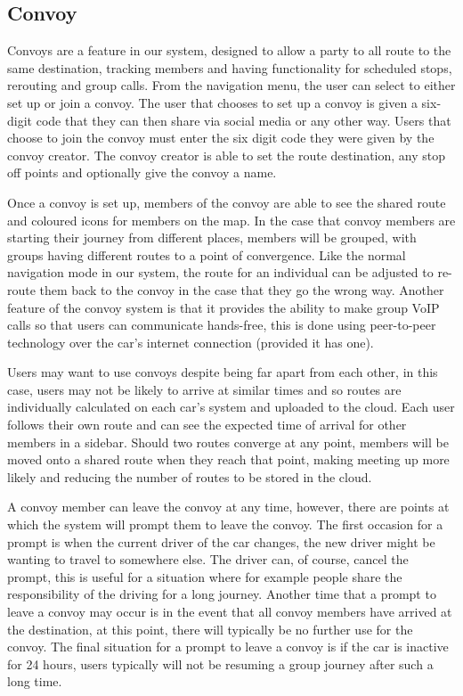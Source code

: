 \documentclass{article}
\begin{document}
\subsection{Convoy}\label{ssec:nav-convoy} %
Convoys are a feature in our system, designed to allow a party to all route to the same destination, tracking members and having functionality for scheduled stops, rerouting and group calls. From the navigation menu, the user can select to either set up or join a convoy. The user that chooses to set up a convoy is given a six-digit code that they can then share via social media or any other way. Users that choose to join the convoy must enter the six digit code they were given by the convoy creator. The convoy creator is able to set the route destination, any stop off points and optionally give the convoy a name.

Once a convoy is set up, members of the convoy are able to see the shared route and coloured icons for members on the map. In the case that convoy members are starting their journey from different places, members will be grouped, with groups having different routes to a point of convergence. Like the normal navigation mode in our system, the route for an individual can be adjusted to re-route them back to the convoy in the case that they go the wrong way. Another feature of the convoy system is that it provides the ability to make group VoIP calls so that users can communicate hands-free, this is done using peer-to-peer technology over the car's internet connection (provided it has one).

Users may want to use convoys despite being far apart from each other, in this case, users may not be likely to arrive at similar times and so routes are individually calculated on each car's system and uploaded to the cloud. Each user follows their own route and can see the expected time of arrival for other members in a sidebar. Should two routes converge at any point, members will be moved onto a shared route when they reach that point, making meeting up more likely and reducing the number of routes to be stored in the cloud.

A convoy member can leave the convoy at any time, however, there are points at which the system will prompt them to leave the convoy. The first occasion for a prompt is when the current driver of the car changes, the new driver might be wanting to travel to somewhere else. The driver can, of course, cancel the prompt, this is useful for a situation where for example people share the responsibility of the driving for a long journey. Another time that a prompt to leave a convoy may occur is in the event that all convoy members have arrived at the destination, at this point, there will typically be no further use for the convoy. The final situation for a prompt to leave a convoy is if the car is inactive for 24 hours, users typically will not be resuming a group journey after such a long time.
\end{document}
